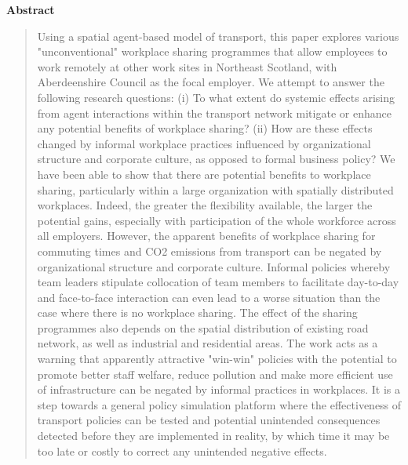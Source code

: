 \vspace{1.5em}
\noindent\textbf{Abstract}\par
\begin{quote}\small
Using a spatial agent-based model of transport, this paper explores various "unconventional" workplace sharing programmes that allow employees to work remotely at other work sites in Northeast Scotland, with Aberdeenshire Council as the focal employer. We attempt to answer the following research questions: (i) To what extent do systemic effects arising from agent interactions within the transport network mitigate or enhance any potential benefits of workplace sharing? (ii) How are these effects changed by informal workplace practices influenced by organizational structure and corporate culture, as opposed to formal business policy? We have been able to show that there are potential benefits to workplace sharing, particularly within a large organization with spatially distributed workplaces. Indeed, the greater the flexibility available, the larger the potential gains, especially with participation of the whole workforce across all employers. However, the apparent benefits of workplace sharing for commuting times and CO2 emissions from transport can be negated by organizational structure and corporate culture. Informal policies whereby team leaders stipulate collocation of team members to facilitate day-to-day and face-to-face interaction can even lead to a worse situation than the case where there is no workplace sharing. The effect of the sharing programmes also depends on the spatial distribution of existing road network, as well as industrial and residential areas. The work acts as a warning that apparently attractive "win-win" policies with the potential to promote better staff welfare, reduce pollution and make more efficient use of infrastructure can be negated by informal practices in workplaces. It is a step towards a general policy simulation platform where the effectiveness of transport policies can be tested and potential unintended consequences detected before they are implemented in reality, by which time it may be too late or costly to correct any unintended negative effects.
\end{quote}

